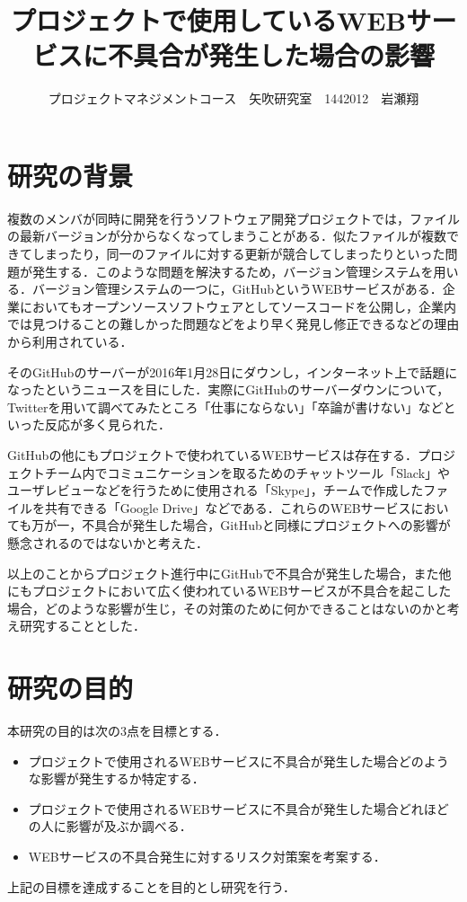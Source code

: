 \documentclass[uplatex,twocolumn,dvipdfmx]{jsarticle}
\title{\vspace{-5mm}\fontsize{14pt}{0pt}\selectfont プロジェクトで使用しているWEBサービスに不具合が発生した場合の影響}
\author{\normalsize プロジェクトマネジメントコース　矢吹研究室　1442012　岩瀬翔}
\date{}
\begin{document}
\fontsize{10.5pt}{\baselineskip}\selectfont
\maketitle





\section{研究の背景}
複数のメンバが同時に開発を行うソフトウェア開発プロジェクトでは，ファイルの最新バージョンが分からなくなってしまうことがある．似たファイルが複数できてしまったり，同一のファイルに対する更新が競合してしまったりといった問題が発生する．このような問題を解決するため，バージョン管理システムを用いる．バージョン管理システムの一つに，GitHubというWEBサービスがある．企業においてもオープンソースソフトウェアとしてソースコードを公開し，企業内では見つけることの難しかった問題などをより早く発見し修正できるなどの理由から利用されている\cite{01}．

そのGitHubのサーバーが2016年1月28日にダウンし，インターネット上で話題になったというニュースを目にした．実際にGitHubのサーバーダウンについて，Twitterを用いて調べてみたところ「仕事にならない」「卒論が書けない」などといった反応が多く見られた\cite{02}．

GitHubの他にもプロジェクトで使われているWEBサービスは存在する．プロジェクトチーム内でコミュニケーションを取るためのチャットツール「Slack」やユーザレビューなどを行うために使用される「Skype」，チームで作成したファイルを共有できる「Google Drive」などである．これらのWEBサービスにおいても万が一，不具合が発生した場合，GitHubと同様にプロジェクトへの影響が懸念されるのではないかと考えた．

以上のことからプロジェクト進行中にGitHubで不具合が発生した場合，また他にもプロジェクトにおいて広く使われているWEBサービスが不具合を起こした場合，どのような影響が生じ，その対策のために何かできることはないのかと考え研究することとした．

\section{研究の目的}
本研究の目的は次の3点を目標とする．
\begin{itemize}
 \item プロジェクトで使用されるWEBサービスに不具合が発生した場合どのような影響が発生するか特定する．
 \item プロジェクトで使用されるWEBサービスに不具合が発生した場合どれほどの人に影響が及ぶか調べる．
 \item WEBサービスの不具合発生に対するリスク対策案を考案する．
\end{itemize}
上記の目標を達成することを目的とし研究を行う．
\end{document}
